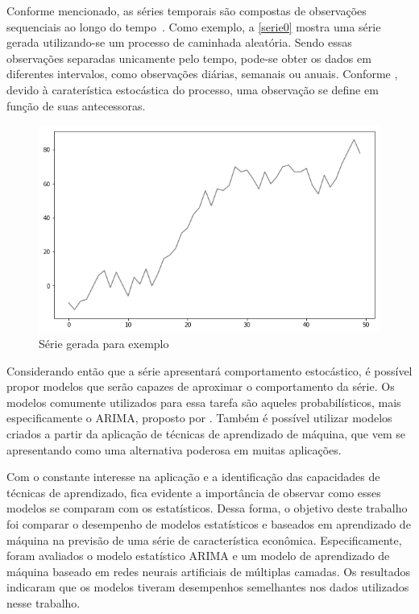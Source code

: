 \documentclass[
    12pt,
    oneside,
    a4paper,
    english,
    brazil
]{abntex2}
\begin{document}
Conforme  mencionado,   as  séries  temporais  são   compostas  de  observações
sequenciais ao  longo do  tempo~\cite{wiley}. Como exemplo,  a \autoref{serie0}
mostra uma série gerada utilizando-se um processo de caminhada aleatória. Sendo
essas observações  separadas unicamente pelo  tempo, pode-se obter os  dados em
diferentes intervalos,  como observações diárias, semanais  ou anuais. Conforme
,  devido  à  caraterística  estocástica  do  processo,  uma
observação se define em função de suas antecessoras.

\begin{figure}[ht]
    \centering
    \caption{Série gerada para exemplo}\label{serie0}
    \includegraphics[width=.5\linewidth]{images/serie_exemplo.png}
\end{figure}

Considerando  então  que  a  série  apresentará  comportamento  estocástico,  é
possível  propor  modelos  que  serão  capazes  de  aproximar  o  comportamento
da  série.  Os  modelos  comumente  utilizados para  essa  tarefa  são  aqueles
probabilísticos, mais especificamente o ARIMA\@, proposto por .
Também é possível utilizar modelos criados a partir da aplicação de técnicas de
aprendizado de máquina,  que vem se apresentando como  uma alternativa poderosa
em muitas aplicações.

Com o  constante interesse na  aplicação e  a identificação das  capacidades de
técnicas de  aprendizado, fica  evidente a importância  de observar  como esses
modelos se comparam com os estatísticos. Dessa forma, o objetivo deste trabalho
foi comparar o desempenho de modelos  estatísticos e baseados em aprendizado de
máquina na previsão de uma  série de característica econômica. Especificamente,
foram  avaliados  o  modelo  estatístico  ARIMA  e  um  modelo  de  aprendizado
de  máquina baseado  em  redes  neurais artificiais  de  múltiplas camadas.  Os
resultados indicaram que  os modelos tiveram desempenhos  semelhantes nos dados
utilizados nesse trabalho.

\end{document}
